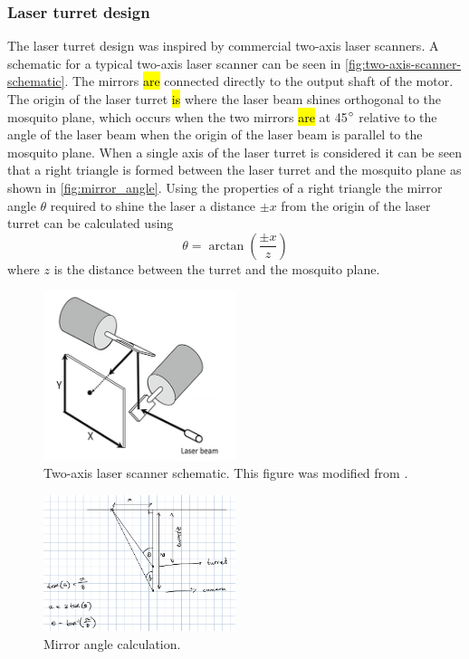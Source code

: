 \subsubsection{Laser turret design}

The laser turret design was inspired by commercial two-axis laser scanners. A schematic for a typical two-axis laser scanner can be seen in \autoref{fig:two-axis-scanner-schematic}. The mirrors \hl{are} connected directly to the output shaft of the motor. The origin of the laser turret \hl{is} where the laser beam shines orthogonal to the mosquito plane, which occurs when the two mirrors \hl{are} at 45$^{\circ}$ relative to the angle of the laser beam when the origin of the laser beam is parallel to the mosquito plane. When a single axis of the laser turret is considered it can be seen that a right triangle is formed between the laser turret and the mosquito plane as shown in \autoref{fig:mirror_angle}. Using the properties of a right triangle the mirror angle $\theta$ required to shine the laser a distance $\pm x$ from the origin of the laser turret can be calculated using
\begin{equation}
    \theta = \arctan{\left(\frac{\pm x}{z}\right)}
    \label{eq:mirror_angle}
\end{equation}
where $z$ is the distance between the turret and the mosquito plane.

\begin{figure}[h]
    \centering
    \includegraphics[width=0.5\textwidth]{figures/hardware_design/two_axis_scanner.png}
    \caption{Two-axis laser scanner schematic. This figure was modified from \cite{two-axis-scanner-schematic}.}
    \label{fig:two-axis-scanner-schematic}
\end{figure}

\begin{figure}[h]
    \centering
    \includegraphics[width=0.5\textwidth]{figures/hardware_design/mirror_angle.png}
    \caption{Mirror angle calculation.}
    \label{fig:mirror_angle}
\end{figure}

